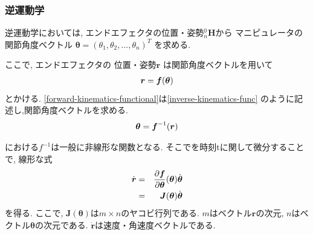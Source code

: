 


\subsubsection{逆運動学}
逆運動学においては, エンドエフェクタの位置・姿勢$^0_n\bm{H}$から
マニピュレータの関節角度ベクトル
$\bm{\theta}=(\theta_1, \theta_2, ..., \theta_n)^T$
を求める.


ここで, %
エンドエフェクタの%
位置・姿勢$\bm{r}$
は関節角度ベクトルを用いて
\begin{eqnarray}
  \bm{r} = \bm{f}(\bm{\theta}) \eqlabel{forward-kinematics-functional}
\end{eqnarray}
とかける.
\eqref{forward-kinematics-functional}は\eqref{inverse-kinematics-func}
のように記述し,関節角度ベクトルを求める.
\begin{eqnarray}
  \bm{\theta} = \bm{f}^{-1}(\bm{r}) \eqlabel{inverse-kinematics-func}
\end{eqnarray}

における$f^{-1}$は一般に非線形な関数となる.
そこでを時刻tに関して微分することで,
線形な式
\begin{eqnarray}
 \dot{\bm{r}} &=& \frac{\partial \bm{f}}{\partial \bm{\theta}}
   (\bm{\theta})\dot{\bm{\theta}} \\
 &=& \bm{J}(\bm{\theta})\dot{\bm{\theta}}
 \eqlabel{inverse-kinematics-base}
\end{eqnarray}
を得る.
ここで, $\bm{J}(\bm{\theta})$は$m \times n$のヤコビ行列である.
$m$はベクトル$\bm{r}$の次元, $n$はベクトル$\bm{\theta}$の次元である.
$\bm{\dot{r}}$は速度・角速度ベクトルである.

